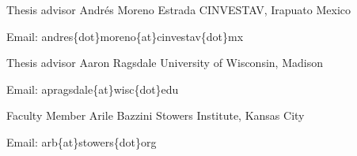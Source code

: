 


\begin{cventries}

\cventry
    {Thesis advisor}
    {Andrés Moreno Estrada}
    {CINVESTAV, Irapuato Mexico}
    {$\;$}
    {
      \begin{cvitems}
        \item {
            Email:  andres\{dot\}moreno\{at\}cinvestav\{dot\}mx
        }
      \end{cvitems}
    }
\cventry
    {Thesis advisor}
    {Aaron Ragsdale}
    {University of Wisconsin, Madison}
    {$\;$}
    {
      \begin{cvitems}
        \item {
            Email:  apragsdale\{at\}wisc\{dot\}edu
        }
      \end{cvitems}
    }

\cventry
    {Faculty Member}
    {Arile Bazzini}
    {Stowers Institute, Kansas City}
    {$\;$}
    {
      \begin{cvitems}
        \item {
            Email:  arb\{at\}stowers\{dot\}org
        }
      \end{cvitems}
    }

\end{cventries}
